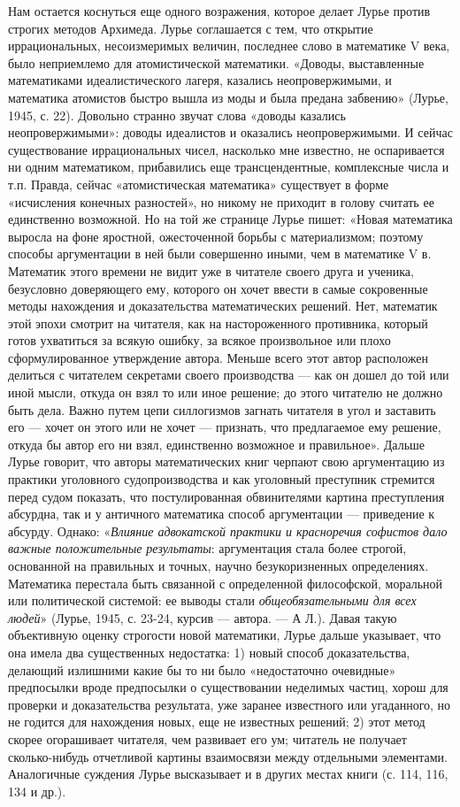 Нам остается коснуться еще одного возражения, которое делает Лурье
против строгих методов Архимеда. Лурье соглашается с тем, что открытие
иррациональных, несоизмеримых величин, последнее слово в математике V
века, было неприемлемо для атомистической математики. «Доводы,
выставленные математиками идеалистического лагеря, казались
неопровержимыми, и математика атомистов быстро вышла из моды и была
предана забвению» (Лурье, 1945, с. 22). Довольно странно звучат слова
«доводы казались неопровержимыми»: доводы идеалистов и оказались
неопровержимыми. И сейчас существование иррациональных чисел,
насколько мне известно, не оспаривается ни одним математиком,
прибавились еще трансцендентные, комплексные числа и т.п. Правда,
сейчас «атомистическая математика» существует в форме «исчисления
конечных разностей», но никому не приходит в голову считать ее
единственно возможной. Но на той же странице Лурье пишет: «Новая
математика выросла на фоне яростной, ожесточенной борьбы с
материализмом; поэтому способы аргументации в ней были совершенно
иными, чем в математике V в. Математик этого времени не видит уже в
читателе своего друга и ученика, безусловно доверяющего ему, которого
он хочет ввести в самые сокровенные методы нахождения и доказательства
математических решений. Нет, математик этой эпохи смотрит на читателя,
как на настороженного противника, который готов ухватиться за всякую
ошибку, за всякое произвольное или плохо сформулированное утверждение
автора. Меньше всего этот автор расположен делиться с читателем
секретами своего производства --- как он дошел до той или иной мысли,
откуда он взял то или иное решение; до этого читателю не должно быть
дела. Важно путем цепи силлогизмов загнать читателя в угол и заставить
его --- хочет он этого или не хочет --- признать, что предлагаемое ему
решение, откуда бы автор его ни взял, единственно возможное и
правильное». Дальше Лурье говорит, что авторы математических книг
черпают свою аргументацию из практики уголовного судопроизводства и
как уголовный преступник стремится перед судом показать, что
постулированная обвинителями картина преступления абсурдна, так и у
античного математика способ аргументации --- приведение к абсурду.
Однако: «\emph{Влияние адвокатской практики и красноречия софистов
дало важные положительные результаты}: аргументация стала более
строгой, основанной на правильных и точных, научно безукоризненных
определениях. Математика перестала быть связанной с определенной
философской, моральной или политической системой: ее выводы стали
\emph{общеобязательными для всех людей}» (Лурье, 1945, с. 23-24,
курсив --- автора. --- А Л.). Давая такую объективную оценку строгости
новой математики, Лурье дальше указывает, что она имела два
существенных недостатка: 1) новый способ доказательства, делающий
излишними какие бы то ни было «недостаточно очевидные» предпосылки
вроде предпосылки о существовании неделимых частиц, хорош для проверки
и доказательства результата, уже заранее известного или угаданного, но
не годится для нахождения новых, еще не известных решений; 2) этот
метод скорее огорашивает читателя, чем развивает его ум; читатель не
получает сколько-нибудь отчетливой картины взаимосвязи между
отдельными элементами. Аналогичные суждения Лурье высказывает и в
других местах книги (с. 114, 116, 134 и др.).

